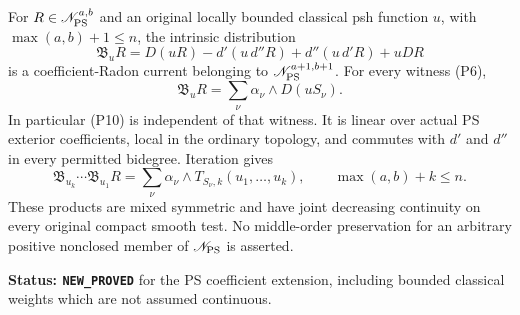\begin{theorem}
\label{thm:r10-pws-corrected-bounded-insertion}
For $R\in\mathscr N_{\rm PS}^{a,b}$ and an original locally
bounded classical psh function $u$, with
$\max(a,b)+1\le n$, the intrinsic distribution
\[
 \mathfrak B_uR
    =D(uR)-d'(u\,d''R)+d''(u\,d'R)+uDR
 \tag{P9}
\]
is a coefficient-Radon current belonging to
$\mathscr N_{\rm PS}^{a+1,b+1}$.  For every witness (P6),
\[
                   \mathfrak B_uR
                         =\sum_\nu\alpha_\nu\wedge D(uS_\nu).
 \tag{P10}
\]
In particular (P10) is independent of that witness.
It is linear over actual PS exterior coefficients, local in
the ordinary topology, and commutes with $d'$ and $d''$ in
every permitted bidegree.  Iteration gives
\[
 \mathfrak B_{u_k}\cdots\mathfrak B_{u_1}R
        =\sum_\nu\alpha_\nu\wedge
                          T_{S_\nu,k}(u_1,\ldots,u_k),
       \qquad \max(a,b)+k\le n.
 \tag{P11}
\]
These products are mixed symmetric and have joint decreasing
continuity on every original compact smooth test.
No middle-order preservation for an arbitrary positive
nonclosed member of $\mathscr N_{\rm PS}$ is asserted.
\end{theorem}

\noindent\textbf{Status: \texttt{NEW\_PROVED}} for the
PS coefficient extension, including bounded classical weights
which are not assumed continuous.

